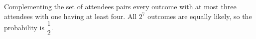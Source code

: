 Complementing the set of attendees pairs every outcome with at most three attendees with one having at least four. All $2^7$ outcomes are equally likely, so the probability is $\boxed{\dfrac{1}{2}}$.

